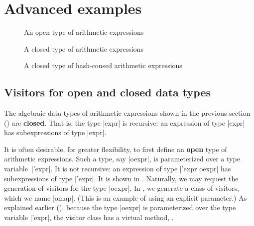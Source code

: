 \documentclass[11pt,a4paper,twoside]{article}
\renewcommand{\emph}[1]{\textbf{#1}}
\begin{document}

\section{Advanced examples}
\label{sec:advanced}


\begin{figure}[p]
\vspace{-\baselineskip}
\caption{An open type of arithmetic expressions} %
\label{fig:expr12}
\end{figure}

\begin{figure}[p]
\caption{A closed type of arithmetic expressions}
\label{fig:expr13}
\end{figure}

\begin{figure}[p]
\caption{A closed type of hash-consed arithmetic expressions}
\label{fig:expr08}
\end{figure}

\subsection{Visitors for open and closed data types}
\label{sec:advanced:openclosed}

The algebraic data types of arithmetic expressions shown in the previous
section () are \emph{closed}. That is, the type \oc|expr|
is recursive: an expression of type \oc|expr| has subexpressions of type
\oc|expr|.

It is often desirable, for greater flexibility, to first define an \emph{open}
type of arithmetic expressions. Such a type, say \oc|oexpr|, is parameterized
over a type variable~\oc|'expr|. It is not recursive: an expression of type
\oc|'expr oexpr| has subexpressions of type \oc|'expr|. It is shown in
. Naturally, we may request the generation of visitors for
the type \oc|oexpr|. In , we generate a class of \map
visitors, which we name \oc|omap|. (This is an example of using an explicit
\name parameter.) As explained earlier (),
because the type \oc|oexpr| is parameterized over the type variable
\oc|'expr|, the visitor class has a virtual method, .
\end{document}
